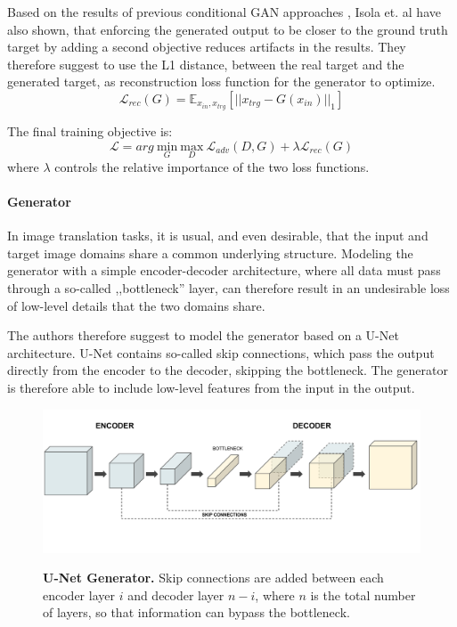 \documentclass[12pt]{report}
\begin{document}
\pagebreak
Based on the results of previous conditional GAN approaches \cite{pathak_context_2016}, Isola et. al \cite{isola_image--image_2016} have also shown, that enforcing the generated output to be closer to the ground truth target by adding a second objective reduces artifacts in the results. They therefore suggest to use the L1 distance, between the real target and the generated target, as reconstruction loss function for the generator to optimize.
\begin{equation}
\mathcal{L}_{rec}(G) = \mathbb{E}_{x_{in},x_{trg}}[||x_{trg}-G(x_{in})||_{1}]
\label{eq:pix2pix_loss_rec}
\end{equation}

The final training objective is:
\begin{equation}
\mathcal{L} = arg \ \underset{G}{\mathrm{min}} \ \underset{D}{\mathrm{max}} \ \mathcal{L}_{adv}(D,G) + \lambda \mathcal{L}_{rec}(G)
\end{equation}
where $\lambda$ controls the relative importance of the two loss functions.


\paragraph{Generator}
In image translation tasks, it is usual, and even desirable, that the input and target image domains share a common underlying structure. Modeling the generator with a simple encoder-decoder architecture, where all data must pass through a so-called ,,bottleneck'' layer, can therefore result in an undesirable loss of low-level details that the two domains share. 

The authors therefore suggest to model the generator based on a U-Net architecture. U-Net contains so-called skip connections, which pass the output directly from the encoder to the decoder, skipping the bottleneck. The generator is therefore able to include low-level features from the input in the output.

\begin{figure}[h]
\centering
{\includegraphics[width=\linewidth]{03_analysis/gans/u-net}}
\caption{\label{fig:u-net} \textbf{U-Net Generator.} Skip connections are added between each encoder layer $i$ and decoder layer $n - i$, where $n$ is the total number of layers, so that information can bypass the bottleneck.}
\end{figure}
\end{document}
